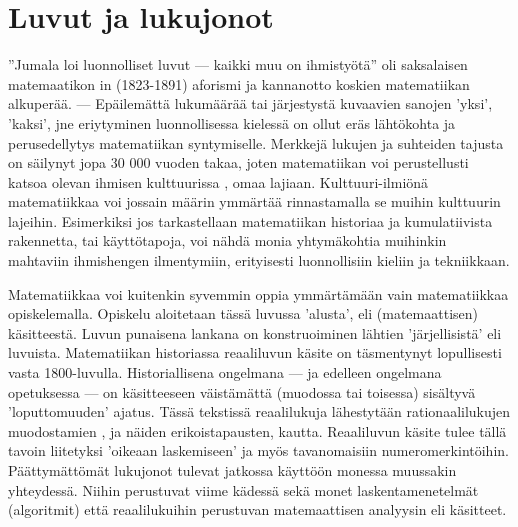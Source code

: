 \chapter{Luvut ja lukujonot}

''Jumala loi luonnolliset luvut --- kaikki muu on ihmistyötä'' oli saksalaisen matemaatikon 
%
in (1823-1891) aforismi ja kannanotto koskien matematiikan alkuperää.
--- Epäilemättä lukumäärää tai järjestystä kuvaavien sanojen 'yksi', 'kaksi', jne eriytyminen
luonnollisessa kielessä on ollut eräs lähtökohta ja perusedellytys matematiikan syntymiselle.
Merkkejä lukujen ja suhteiden tajusta on säilynyt jopa 30 000 vuoden takaa, joten matematiikan
voi perustellusti katsoa olevan ihmisen kulttuurissa , omaa lajiaan.
Kulttuuri-ilmiönä matematiikkaa voi jossain määrin ymmärtää rinnastamalla se muihin
kulttuurin lajeihin. Esimerkiksi jos tarkastellaan matematiikan historiaa ja kumulatiivista
rakennetta, tai käyttötapoja, voi nähdä monia yhtymäkohtia muihinkin mahtaviin ihmishengen
ilmentymiin, erityisesti luonnollisiin kieliin ja tekniikkaan.

Matematiikkaa voi kuitenkin syvemmin oppia ymmärtämään vain matematiikkaa opiskelemalla.
Opiskelu aloitetaan tässä luvussa 'alusta', eli (matemaattisen)  käsitteestä. Luvun
punaisena lankana on  konstruoiminen lähtien 'järjellisistä' eli
 luvuista. Matematiikan historiassa reaaliluvun käsite on täsmentynyt
lopullisesti vasta 1800-luvulla. Historiallisena ongelmana --- ja edelleen ongelmana
opetuksessa --- on käsitteeseen väistämättä (muodossa tai toisessa) sisältyvä 'loputtomuuden'
ajatus. Tässä tekstissä reaalilukuja lähestytään rationaalilukujen muodostamien
, ja näiden erikoistapausten,  kautta.
Reaaliluvun käsite tulee tällä tavoin liitetyksi 'oikeaan laskemiseen' ja myös tavanomaisiin
numeromerkintöihin. Päättymättömät lukujonot tulevat jatkossa käyttöön monessa muussakin
yhteydessä. Niihin perustuvat viime kädessä sekä monet laskentamenetelmät (algoritmit) että
reaalilukuihin perustuvan matemaattisen analyysin eli  käsitteet.